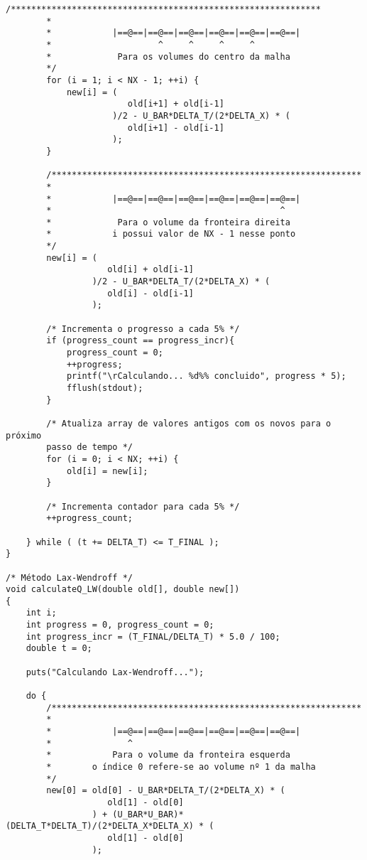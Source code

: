 \begin{Verbatim}[fontsize=\footnotesize]
        /*************************************************************
        *
        *            |==@==|==@==|==@==|==@==|==@==|==@==|
        *                     ^     ^     ^     ^
        *             Para os volumes do centro da malha
        */
        for (i = 1; i < NX - 1; ++i) {
            new[i] = (
                        old[i+1] + old[i-1]
                     )/2 - U_BAR*DELTA_T/(2*DELTA_X) * (
                        old[i+1] - old[i-1]
                     );
        }

        /*************************************************************
        *
        *            |==@==|==@==|==@==|==@==|==@==|==@==|
        *                                             ^
        *             Para o volume da fronteira direita
        *            i possui valor de NX - 1 nesse ponto
        */
        new[i] = (
                    old[i] + old[i-1]
                 )/2 - U_BAR*DELTA_T/(2*DELTA_X) * (
                    old[i] - old[i-1]
                 );

        /* Incrementa o progresso a cada 5% */
        if (progress_count == progress_incr){
            progress_count = 0;
            ++progress;
            printf("\rCalculando... %d%% concluido", progress * 5);
            fflush(stdout);
        }

        /* Atualiza array de valores antigos com os novos para o próximo
        passo de tempo */
        for (i = 0; i < NX; ++i) {
            old[i] = new[i];
        }

        /* Incrementa contador para cada 5% */
        ++progress_count;

    } while ( (t += DELTA_T) <= T_FINAL );
}

/* Método Lax-Wendroff */
void calculateQ_LW(double old[], double new[])
{
    int i;
    int progress = 0, progress_count = 0;
    int progress_incr = (T_FINAL/DELTA_T) * 5.0 / 100;
    double t = 0;

    puts("Calculando Lax-Wendroff...");

    do {
        /*************************************************************
        *
        *            |==@==|==@==|==@==|==@==|==@==|==@==|
        *               ^
        *            Para o volume da fronteira esquerda
        *        o índice 0 refere-se ao volume nº 1 da malha
        */
        new[0] = old[0] - U_BAR*DELTA_T/(2*DELTA_X) * (
                    old[1] - old[0]
                 ) + (U_BAR*U_BAR)*(DELTA_T*DELTA_T)/(2*DELTA_X*DELTA_X) * (
                    old[1] - old[0]
                 );


\end{Verbatim}
